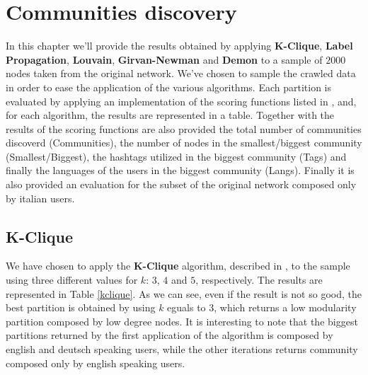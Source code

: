 \chapter{Communities discovery} %
\label{cha:communities_discovery}

In this chapter we'll provide the results obtained by applying \textbf{K-Clique}, \textbf{Label Propagation},
\textbf{Louvain}, \textbf{Girvan-Newman} and \textbf{Demon} to a sample of $2000$ nodes taken from the original
network. We've chosen to sample the crawled data in order to ease the application of the various algorithms.
Each partition is evaluated by applying an implementation of the scoring functions listed in
\cite{comm_ground_truth}, and, for each algorithm, the results are represented in a table. Together with the
results of the scoring functions are also provided the total number of communities discoverd (Communities), the
number of nodes in the smallest/biggest community (Smallest/Biggest), the hashtags utilized in the biggest
community (Tags) and finally the languages of the users in the biggest community (Langs). Finally it is also
provided an evaluation for the subset of the original network composed only by italian users.

\section{K-Clique} %
\label{sec:k_clique}
    We have chosen to apply the \textbf{K-Clique} algorithm, described in \cite{k_clique}, to the sample using
    three different values for $k$: $3$, $4$ and $5$, respectively. The results are represented in Table
    \ref{kclique}. As we can see, even if the result is not so good, the best partition is obtained by using $k$
    eguals to $3$, which returns a low modularity partition composed by low degree nodes. It is interesting to
    note that the biggest partitions returned by the first application of the algorithm is composed
    by english and deutsch speaking users, while the other iterations returns community composed only by english
    speaking users.

